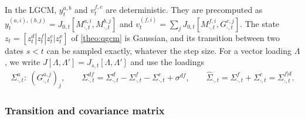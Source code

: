 \documentclass[11pt,english]{amsart}
\theoremstyle{definition}
\begin{document}
In the LGCM, $y^{a,b}_t$ and $v^{f,c}_t$ are deterministic. They are precomputed as $y^{(a,i),(b,j)}_t = J_{0,t}[M^{a,i}_{\cdot,t},M^{b,j}_{\cdot,t}]$ and $v^{(f,i)}_t = \sum_{j} J_{0,t}[M^{f,i}_{\cdot,t},G^{c,j}_{\cdot,t}]$. The state $z_t = [z^d_t | z^f_t | z^c_t | z^x_t]$ of \autoref{theo:qgcm} is Gaussian, and its transition between two dates $s<t$ can be sampled exactly, whatever the step size. For a vector loading $\Lambda$, we write $J[\Lambda,\Lambda'] = J_{s,t}[\Lambda,\Lambda']$ and use the loadings
\begin{eqnarray*}
  \Sigma^a_{\cdot,t}: \ \left(G^{a,j}_{\cdot,t}\right)_j , \qquad
  \Sigma^{df}_{\cdot,t} = \Sigma^d_{\cdot,t} - \Sigma^f_{\cdot,t} - \Sigma^c_{\cdot,t} + \sigma^{df} , \qquad
  \hat{\Sigma}_{\cdot,t} = \Sigma^f_{\cdot,t} + \Sigma^c_{\cdot,t} = \Sigma^{f|d}_{\cdot,t} .
\end{eqnarray*}

\subsubsection{Transition and covariance matrix}
\end{document}
